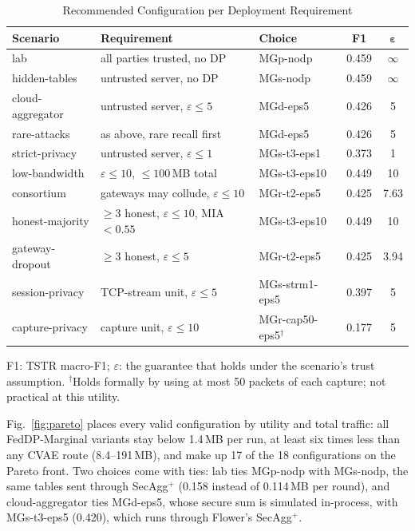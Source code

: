 \documentclass[conference]{IEEEtran}
\begin{document}
\begin{table}[!t]
\centering
\caption{Recommended Configuration per Deployment Requirement}
\label{tab:recommend}
\scriptsize
\setlength{\tabcolsep}{2.5pt}
\begin{tabularx}{\columnwidth}{l >{\raggedright\arraybackslash}X l c c}
\toprule
\textbf{Scenario} & \textbf{Requirement} & \textbf{Choice} & \textbf{F1} & $\boldsymbol{\varepsilon}$ \\
\midrule
lab              & all parties trusted, no DP           & MGp-nodp       & 0.459 & $\infty$ \\
hidden-tables    & untrusted server, no DP              & MGs-nodp       & 0.459 & $\infty$ \\
cloud-aggregator & untrusted server, $\varepsilon \le 5$ & MGd-eps5      & 0.426 & 5 \\
rare-attacks     & as above, rare recall first          & MGd-eps5       & 0.426 & 5 \\
strict-privacy   & untrusted server, $\varepsilon \le 1$ & MGs-t3-eps1   & 0.373 & 1 \\
low-bandwidth    & $\varepsilon \le 10$, $\le 100$\,MB total & MGs-t3-eps10 & 0.449 & 10 \\
consortium       & gateways may collude, $\varepsilon \le 10$ & MGr-t2-eps5 & 0.425 & 7.63 \\
honest-majority  & $\ge 3$ honest, $\varepsilon \le 10$, MIA $< 0.55$ & MGs-t3-eps10 & 0.449 & 10 \\
gateway-dropout  & $\ge 3$ honest, $\varepsilon \le 5$  & MGr-t2-eps5    & 0.425 & 3.94 \\
session-privacy  & TCP-stream unit, $\varepsilon \le 5$ & MGs-strm1-eps5 & 0.397 & 5 \\
capture-privacy  & capture unit, $\varepsilon \le 10$  & MGr-cap50-eps5$^\dagger$ & 0.177 & 5 \\
\bottomrule
\end{tabularx}

\vspace{2pt}
\parbox{\columnwidth}{\scriptsize F1: TSTR macro-F1; $\varepsilon$: the guarantee that holds under the scenario's trust assumption. $^\dagger$Holds formally by using at most 50 packets of each capture; not practical at this utility.}
\end{table}

Fig.~\ref{fig:pareto} places every valid configuration by utility and total traffic: all FedDP-Marginal variants stay below 1.4\,MB per run, at least six times less than any CVAE route (8.4--191\,MB), and make up 17 of the 18 configurations on the Pareto front. Two choices come with ties: lab ties MGp-nodp with MGs-nodp, the same tables sent through SecAgg$^+$ (0.158 instead of 0.114\,MB per round), and cloud-aggregator ties MGd-eps5, whose secure sum is simulated in-process, with MGs-t3-eps5 (0.420), which runs through Flower's SecAgg$^+$.
\end{document}
